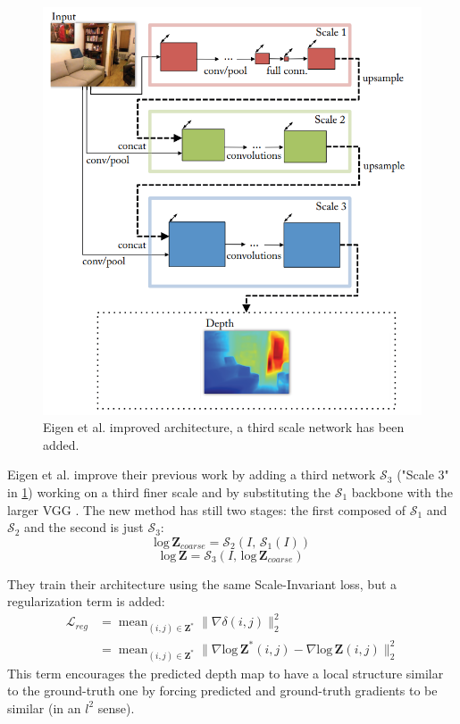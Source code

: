 \begin{figure}
\centering
\includegraphics[scale=0.5]{figs/Eigen2}
\caption{Eigen et al. \cite{Eigen2} improved architecture, a third scale network has been added.}
\label{fig:Eigen2}
\end{figure}

Eigen et al. \cite{Eigen2} improve their previous work \cite{Eigen} by adding a third network $\mathcal{S}_{3}$ ("Scale 3" in \ref{fig:Eigen2}) working on a third finer scale and by substituting the $\mathcal{S}_{1}$ backbone with the larger VGG \cite{VGG}.
The new method has still two stages: the first composed of $\mathcal{S}_{1}$ and $\mathcal{S}_{2}$ and the second is just $\mathcal{S}_{3}$:
\[
	\text{log} \, \mathbf{Z}_{coarse} = \mathcal{S}_{2}(I, \, \mathcal{S}_{1}(I))
\]\[
	\text{log} \, \mathbf{Z} = \mathcal{S}_{3}(I, \, \text{log} \, \mathbf{Z}_{coarse})
\]

They train their architecture using the same Scale-Invariant loss, but a regularization term is added:
\begin{equation}
\begin{split}
	\mathcal{L}_{reg} & = \mathop{\text{mean}}_{(i, j) \in \mathbf{Z}^{*}}
		\big\|
			\nabla \delta(i, j)
		\big\|_{2}^{2} \\
	& = \mathop{\text{mean}}_{(i, j) \in \mathbf{Z}^{*}}
		\big\|
			\nabla \text{log} \, \mathbf{Z}^{*} (i, j) - \nabla \text{log} \, \mathbf{Z} (i, j)
		\big\|_{2}^{2}
\end{split}
\end{equation}
This term encourages the predicted depth map to have a local structure similar to the ground-truth one by forcing predicted and ground-truth gradients to be similar (in an $l^{2}$ sense).

